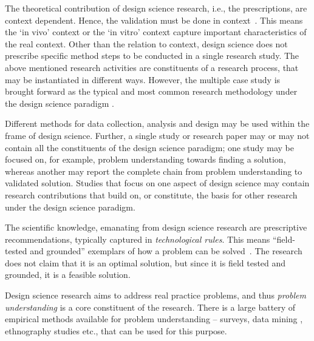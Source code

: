 \documentclass[graybox]{svmult}
\begin{document}
The theoretical contribution of design science research, i.e., the prescriptions, are context dependent. Hence, the validation must be done in context~\cite{wieringa_what_2014}.  This means the  `in vivo' context or the `in vitro' context  capture important characteristics of the real context.  Other than the relation to context, design science does not prescribe specific %
method steps to be conducted in a single research study. The above mentioned research activities are constituents of  a research process, that may be instantiated in different ways. However, the multiple case study is brought forward as the typical and most common research methodology under the design science paradigm  \cite{van_aken_management_2004}.

Different methods for data collection, analysis and design may be used within the frame of design science. Further, a single study or research paper may or may not contain all the constituents of the design science paradigm; one study may be focused on, for example,  problem understanding towards finding a solution, whereas another may report the complete chain from problem understanding to validated solution. Studies that focus on one aspect of design science may contain research contributions that build on, or constitute, the basis for other research under the design science paradigm.

The scientific knowledge, emanating from design science research are prescriptive recommendations, typically captured in \emph{technological rules}. This means ``field-tested and grounded'' exemplars of how a problem can be solved~\cite{van_aken_management_2004}. The research does not claim that it is an optimal solution, but since it is field tested and grounded, it is a feasible solution.

Design science research aims to address real practice problems, and thus \emph{problem understanding} is a core constituent of the research. There is a large battery of empirical methods available for problem understanding -- surveys, data mining \cite{MenziesDataMining2016}, ethnography studies \cite{SharpEthnography2016} etc., that can be used for this purpose. 
\end{document}
